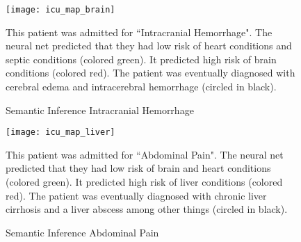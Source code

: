 \begin{figure}
\texttt{[image: icu\_map\_brain]}
\caption{Semantic Inference Intracranial Hemorrhage}
\vspace{12px}
This patient was admitted for ``Intracranial Hemorrhage".  The neural net predicted that they had low risk of heart conditions and septic conditions (colored green).  It predicted high risk of brain conditions (colored red).  The patient was eventually diagnosed with cerebral edema and intracerebral hemorrhage (circled in black).
\label{fig:icu_map_brain}
\end{figure}

\begin{figure}
\texttt{[image: icu\_map\_liver]}
\caption{Semantic Inference Abdominal Pain}
\vspace{12px}
This patient was admitted for ``Abdominal Pain".  The neural net predicted that they had low risk of brain and heart conditions (colored green).  It predicted high risk of liver conditions (colored red).  The patient was eventually diagnosed with chronic liver cirrhosis and a liver abscess among other things (circled in black).
\label{fig:icu_map_liver}
\end{figure}